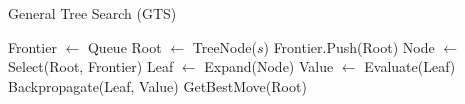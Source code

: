 \begin{algorithm}[H]
    \caption{General Tree Search (GTS)}
    \label{alg:general_tree_search_1}
    \begin{algorithmic}[1]
    
        \State Frontier $\leftarrow$ Queue
        \State Root $\leftarrow$ TreeNode($s$)
        \State Frontier.Push(Root)
            \State Node $\leftarrow$ Select(Root, Frontier)
            \State Leaf $\leftarrow$ Expand(Node)
                \State Value $\leftarrow$ Evaluate(Leaf)
                \State Backpropagate(Leaf, Value)
            \EndIf
        \EndWhile
        \State \Return GetBestMove(Root)
    \EndProcedure
    \end{algorithmic}
\end{algorithm}